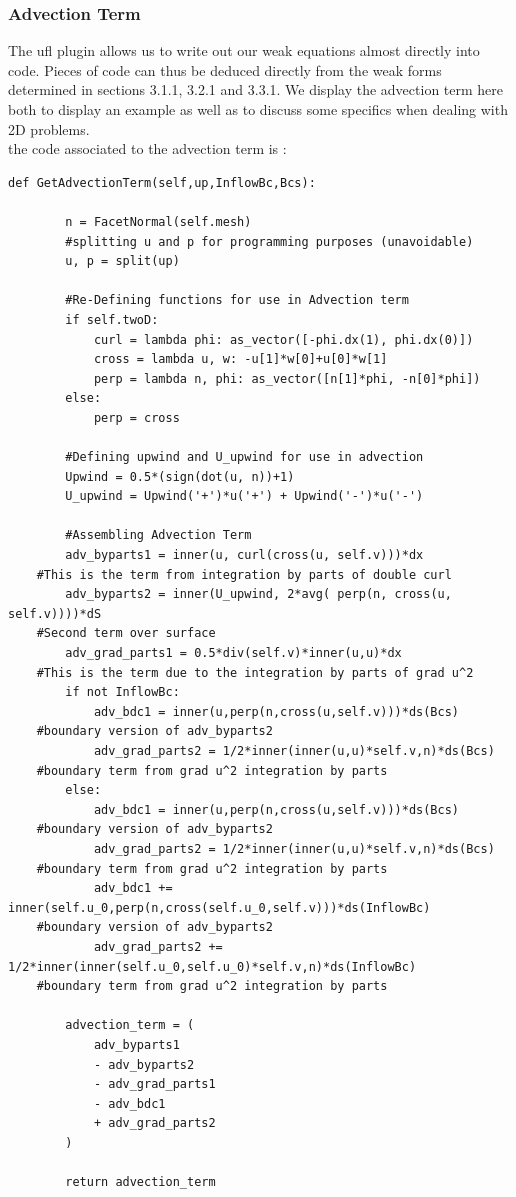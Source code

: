\documentclass[11pt,twoside,a4paper]{article}
\begin{document}
\subsubsection{Advection Term}
The ufl plugin allows us to write out our weak equations almost directly into code. Pieces of code can thus be deduced directly from the weak forms determined in sections 3.1.1, 3.2.1 and 3.3.1. We display the advection term here both to display an example as well as to discuss some specifics when dealing with 2D problems.\\
the code associated to the advection term is :
\begin{lstlisting}
def GetAdvectionTerm(self,up,InflowBc,Bcs):

        n = FacetNormal(self.mesh)
        #splitting u and p for programming purposes (unavoidable)
        u, p = split(up)

        #Re-Defining functions for use in Advection term
        if self.twoD:
            curl = lambda phi: as_vector([-phi.dx(1), phi.dx(0)])
            cross = lambda u, w: -u[1]*w[0]+u[0]*w[1]
            perp = lambda n, phi: as_vector([n[1]*phi, -n[0]*phi])
        else:
            perp = cross

        #Defining upwind and U_upwind for use in advection
        Upwind = 0.5*(sign(dot(u, n))+1)
        U_upwind = Upwind('+')*u('+') + Upwind('-')*u('-')

        #Assembling Advection Term
        adv_byparts1 = inner(u, curl(cross(u, self.v)))*dx
	#This is the term from integration by parts of double curl
        adv_byparts2 = inner(U_upwind, 2*avg( perp(n, cross(u, self.v))))*dS
	#Second term over surface
        adv_grad_parts1 = 0.5*div(self.v)*inner(u,u)*dx
	#This is the term due to the integration by parts of grad u^2
        if not InflowBc:
            adv_bdc1 = inner(u,perp(n,cross(u,self.v)))*ds(Bcs)
	#boundary version of adv_byparts2
            adv_grad_parts2 = 1/2*inner(inner(u,u)*self.v,n)*ds(Bcs)
	#boundary term from grad u^2 integration by parts
        else:
            adv_bdc1 = inner(u,perp(n,cross(u,self.v)))*ds(Bcs)
	#boundary version of adv_byparts2
            adv_grad_parts2 = 1/2*inner(inner(u,u)*self.v,n)*ds(Bcs)
	#boundary term from grad u^2 integration by parts
            adv_bdc1 +=  inner(self.u_0,perp(n,cross(self.u_0,self.v)))*ds(InflowBc)
	#boundary version of adv_byparts2
            adv_grad_parts2 += 1/2*inner(inner(self.u_0,self.u_0)*self.v,n)*ds(InflowBc)
	#boundary term from grad u^2 integration by parts

        advection_term = (
            adv_byparts1
            - adv_byparts2
            - adv_grad_parts1
            - adv_bdc1
            + adv_grad_parts2
        )

        return advection_term
\end{lstlisting}
\end{document}
